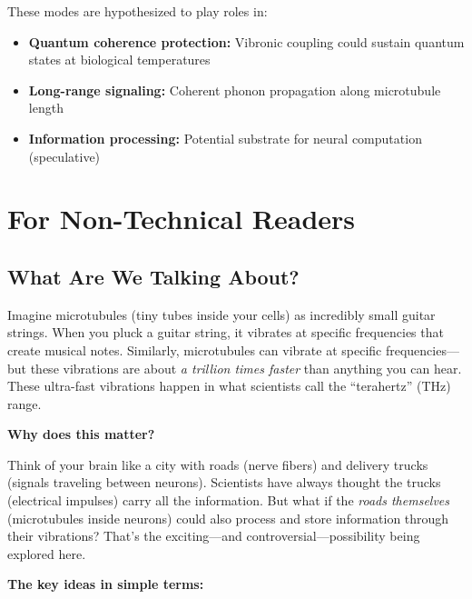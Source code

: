 These modes are hypothesized to play roles in:
\begin{itemize}
\item \textbf{Quantum coherence protection:} Vibronic coupling could sustain quantum states at biological temperatures
\item \textbf{Long-range signaling:} Coherent phonon propagation along microtubule length
\item \textbf{Information processing:} Potential substrate for neural computation (speculative)
\end{itemize}

\section{For Non-Technical Readers}
\label{sec:nontechnical}

\subsection{What Are We Talking About?}

Imagine microtubules (tiny tubes inside your cells) as incredibly small
guitar strings. When you pluck a guitar string, it vibrates at specific
frequencies that create musical notes. Similarly, microtubules can
vibrate at specific frequencies---but these vibrations are about
\emph{a trillion times faster} than anything you can hear. These
ultra-fast vibrations happen in what scientists call the ``terahertz''
(THz) range.

\textbf{Why does this matter?}

Think of your brain like a city with roads (nerve fibers) and delivery
trucks (signals traveling between neurons). Scientists have always
thought the trucks (electrical impulses) carry all the information. But
what if the \emph{roads themselves} (microtubules inside neurons) could
also process and store information through their vibrations?
That's the exciting---and
controversial---possibility being explored here.

\textbf{The key ideas in simple terms:}

